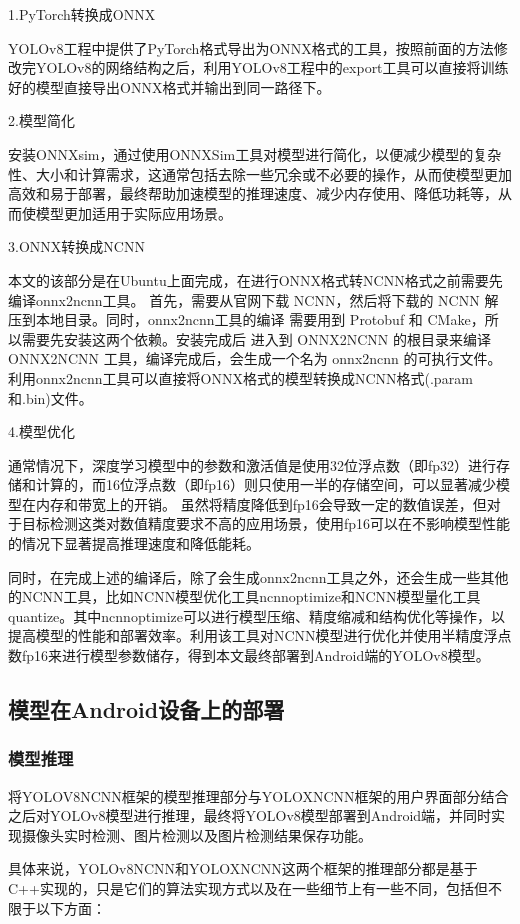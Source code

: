 \documentclass{ctexart}
\numberwithin{equation}{section}%
\numberwithin{figure}{section}%
\numberwithin{table}{section}%
\begin{document}
	1.PyTorch转换成ONNX
	
	YOLOv8工程中提供了PyTorch格式导出为ONNX格式的工具，按照前面的方法修改完YOLOv8的网络结构之后，利用YOLOv8工程中的export工具可以直接将训练好的模型直接导出ONNX格式并输出到同一路径下。
	
	2.模型简化
	
	安装ONNXsim，通过使用ONNXSim工具对模型进行简化，以便减少模型的复杂性、大小和计算需求，这通常包括去除一些冗余或不必要的操作，从而使模型更加高效和易于部署，最终帮助加速模型的推理速度、减少内存使用、降低功耗等，从而使模型更加适用于实际应用场景。
	
	3.ONNX转换成NCNN
	
	本文的该部分是在Ubuntu上面完成，在进行ONNX格式转NCNN格式之前需要先编译onnx2ncnn工具。
	首先，需要从官网下载 NCNN，然后将下载的 NCNN 解压到本地目录。同时，onnx2ncnn工具的编译 需要用到 Protobuf 和 CMake，所以需要先安装这两个依赖。安装完成后
	进入到 ONNX2NCNN 的根目录来编译 ONNX2NCNN 工具，编译完成后，会生成一个名为 onnx2ncnn 的可执行文件。利用onnx2ncnn工具可以直接将ONNX格式的模型转换成NCNN格式(.param和.bin)文件。
	
	4.模型优化

	通常情况下，深度学习模型中的参数和激活值是使用32位浮点数（即fp32）进行存储和计算的，而16位浮点数（即fp16）则只使用一半的存储空间，可以显著减少模型在内存和带宽上的开销。
	虽然将精度降低到fp16会导致一定的数值误差，但对于目标检测这类对数值精度要求不高的应用场景，使用fp16可以在不影响模型性能的情况下显著提高推理速度和降低能耗。
	
	同时，在完成上述的编译后，除了会生成onnx2ncnn工具之外，还会生成一些其他的NCNN工具，比如NCNN模型优化工具ncnnoptimize和NCNN模型量化工具quantize。其中ncnnoptimize可以进行模型压缩、精度缩减和结构优化等操作，以提高模型的性能和部署效率。利用该工具对NCNN模型进行优化并使用半精度浮点数fp16来进行模型参数储存，得到本文最终部署到Android端的YOLOv8模型。
	
	\subsection{模型在Android设备上的部署}
	\subsubsection{模型推理}
	将YOLOV8NCNN框架的模型推理部分与YOLOXNCNN框架的用户界面部分结合之后对YOLOv8模型进行推理，最终将YOLOv8模型部署到Android端，并同时实现摄像头实时检测、图片检测以及图片检测结果保存功能。
	
	具体来说，YOLOv8NCNN和YOLOXNCNN这两个框架的推理部分都是基于C++实现的，只是它们的算法实现方式以及在一些细节上有一些不同，包括但不限于以下方面：
	
\end{document}
